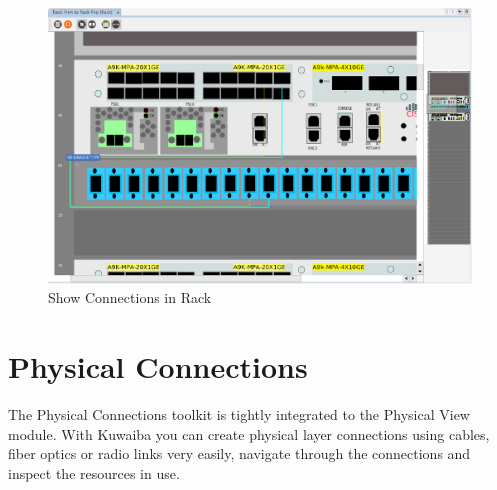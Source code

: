 \documentclass[a4paper]{article}
\begin{document}
		\begin{figure}[h!]
			\centering
			\includegraphics[width=0.95\linewidth]{img/rack_view_connections.png}
			\caption{Show Connections in Rack}
			\label{fig:rack_view_connections}
		\end{figure}
		
	\clearpage
	\section{Physical Connections} \label{sec:physical_connections}
		The Physical Connections toolkit is tightly integrated to the Physical View module. With Kuwaiba you can create physical layer connections using cables, fiber optics or radio links very easily, navigate through the connections and inspect the resources in use.\newline
		
\end{document}
